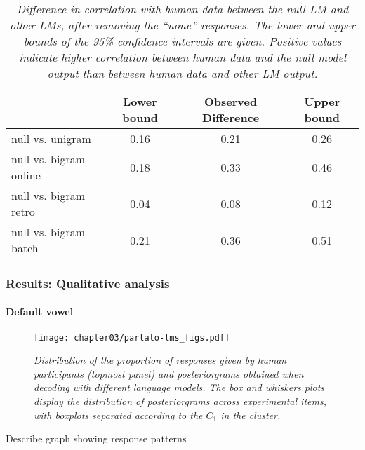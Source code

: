 {%
\begin{table}[ht]
\centering
\caption{\textit{Difference in correlation with human data between the null LM and other LMs, after removing the ``none'' responses. The lower and upper bounds of the 95\% confidence intervals are given. Positive values indicate higher correlation between human data and the null model output than between human data and other LM output.}}
\label{tab:parlato_lms-cor_diff-nonone}
\vspace{0.25cm}
\begin{tabular}{lccc}
   \toprule
  & Lower bound & Observed Difference & Upper bound \\  \midrule
null vs. unigram & 0.16 & 0.21 & 0.26  \\ 
null vs. bigram online   & 0.18 & 0.33 & 0.46 \\ 
null vs. bigram retro    & 0.04 & 0.08 & 0.12 \\ 
 null vs. bigram batch    & 0.21 & 0.36 & 0.51 \\  \bottomrule 
\end{tabular}
\end{table}


\subsubsection{Results: Qualitative analysis}

\paragraph{Default vowel}

\begin{figure}[htb!]
    \centering
    \texttt{[image: chapter03/parlato-lms\_figs.pdf]}
    \caption{\textit{Distribution of the proportion of responses given by human participants (topmost panel) and posteriorgrams obtained when decoding with different language models. The box and whiskers plots display the distribution of posteriorgrams across experimental items, with boxplots separated according to the $C_{1}$ in the cluster.}}
    \label{fig:parlato-lms}
  \end{figure}

{\color{red}Describe graph showing response patterns}


}
